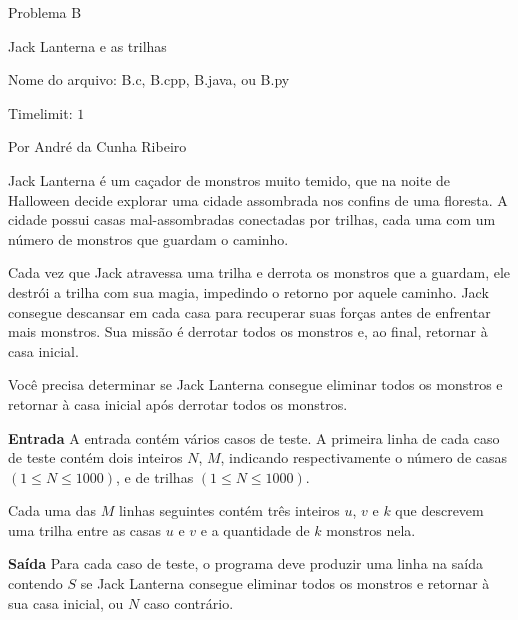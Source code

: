 \begin{center}
Problema B

Jack Lanterna e as trilhas

{\small Nome do arquivo: B.c, B.cpp, B.java, ou B.py}

{\large Timelimit: $1$}

{\tiny Por André da Cunha Ribeiro}

\end{center}					

{\footnotesize
Jack Lanterna é um caçador de monstros muito temido, que na noite de Halloween decide explorar uma cidade assombrada nos confins de uma floresta. A cidade possui casas mal-assombradas conectadas por trilhas, cada uma com um número de monstros que guardam o caminho.

Cada vez que Jack atravessa uma trilha e derrota os monstros que a guardam, ele destrói a trilha com sua magia, impedindo o retorno por aquele caminho. Jack consegue descansar em cada casa para recuperar suas forças antes de enfrentar mais monstros. Sua missão é derrotar todos os monstros e, ao final, retornar à casa inicial.

Você precisa determinar se Jack Lanterna consegue eliminar todos os monstros e retornar à casa inicial após derrotar todos os monstros.}

\vspace{0.3cm}
\textbf{Entrada}
A entrada contém vários casos de teste. A primeira linha de cada caso de teste contém dois inteiros $N$, $M$, indicando respectivamente o número de casas $(1 \leq N \leq 1000)$, e de trilhas $(1 \leq N \leq 1000)$. 

Cada uma das $M$ linhas seguintes contém três inteiros $u$, $v$ e $k$ que descrevem uma trilha entre as casas $u$ e $v$ e a quantidade de $k$ monstros nela.

\vspace{0.3cm}
\textbf{Saída}
Para cada caso de teste, o programa deve produzir uma linha na saída contendo $S$ se Jack Lanterna consegue eliminar todos os monstros e retornar à sua casa inicial, ou $N$ caso contrário.

